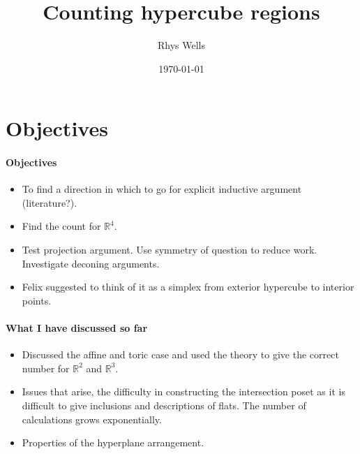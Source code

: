 \documentclass[a4paper,12pt]{article}
\title{Counting hypercube regions}
\author{Rhys Wells}
\date{\today}
\theoremstyle{definition}
\theoremstyle{indented}
\newenvironment{titlemize}[1]{%
  \paragraph{#1}
  \begin{itemize}}
  {\end{itemize}}
\begin{document}
\maketitle
\tableofcontents


\section{Objectives}

\begin{titlemize} {Objectives}

\item To find a direction in which to go for explicit inductive argument (literature?).

\item Find the count for $\mathbb{R}^4$.

\item Test projection argument. Use symmetry of question to reduce work. Investigate deconing arguments. 

\item Felix suggested to think of it as a simplex from exterior hypercube to interior points.


\end{titlemize}

\begin{titlemize}{What I have discussed so far}


\item Discussed the affine and toric case and used the theory to give the correct number for $\mathbb{R}^2$ and $\mathbb{R}^3$.


\item Issues that arise, the difficulty in constructing the intersection poset as it is difficult to give inclusions and descriptions of flats. The number of calculations grows exponentially.


\item Properties of the hyperplane arrangement.


\end{titlemize}
\end{document}
